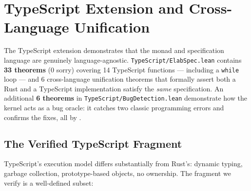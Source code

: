 
\section{TypeScript Extension and Cross-Language Unification}
\label{sec:typescript}

The TypeScript extension demonstrates that the \RustM monad and \ProgramSpec
specification language are genuinely language-agnostic.
\texttt{TypeScript/ElabSpec.lean} contains \textbf{33 theorems} (0 sorry)
covering 14 TypeScript functions — including a \texttt{while} loop — and
6 cross-language unification theorems that formally assert both a Rust and a
TypeScript implementation satisfy the \emph{same} specification.
An additional \textbf{6 theorems} in \texttt{TypeScript/BugDetection.lean}
demonstrate how the kernel acts as a bug oracle: it catches two classic
programming errors and confirms the fixes, all by \rfl.

\subsection{The Verified TypeScript Fragment}
\label{sec:ts-fragment}

TypeScript's execution model differs substantially from Rust's: dynamic
typing, garbage collection, prototype-based objects, no ownership.
The fragment we verify is a well-defined subset:

